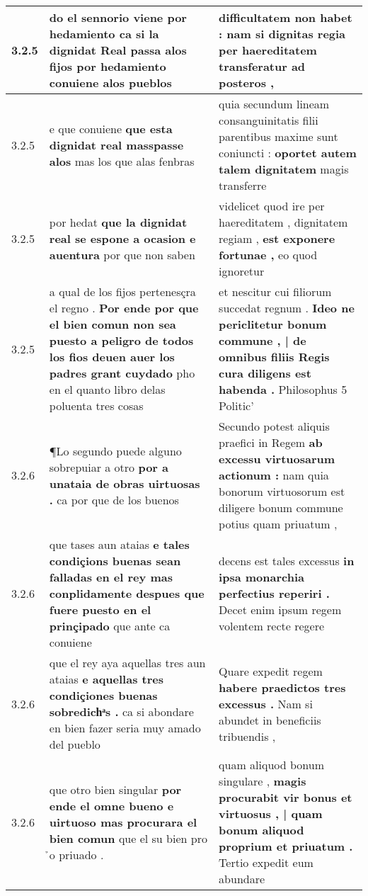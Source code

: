 \begin{tabular}{|p{1cm}|p{6.5cm}|p{6.5cm}|}
3.2.5 & do el sennorio viene por hedamiento \textbf{ ca si la dignidat Real passa alos fijos } por hedamiento conuiene alos pueblos & difficultatem non habet : \textbf{ nam si dignitas regia } per haereditatem transferatur ad posteros , \\\hline
3.2.5 & e que conuiene \textbf{ que esta dignidat real masspasse alos } mas los que alas fenbras & quia secundum lineam consanguinitatis filii parentibus maxime sunt coniuncti : \textbf{ oportet autem talem dignitatem } magis transferre \\\hline
3.2.5 & por hedat \textbf{ que la dignidat real se espone a ocasion e auentura } por que non saben & videlicet quod ire per haereditatem , dignitatem regiam , \textbf{ est exponere fortunae , } eo quod ignoretur \\\hline
3.2.5 & a qual de los fijos pertenesçra el regno . \textbf{ Por ende por que el bien comun non sea puesto a peligro de todos los fios deuen auer los padres grant cuydado } pho en el quanto libro delas poluenta tres cosas & et nescitur cui filiorum succedat regnum . \textbf{ Ideo ne periclitetur bonum commune , | de omnibus filiis Regis cura diligens est habenda . } Philosophus 5 Politic’ \\\hline
3.2.6 & ¶Lo segundo puede alguno sobrepuiar a otro \textbf{ por a unataia de obras uirtuosas . } ca por que de los buenos & Secundo potest aliquis praefici in Regem \textbf{ ab excessu virtuosarum actionum : } nam quia bonorum virtuosorum est diligere bonum commune potius quam priuatum , \\\hline
3.2.6 & que tases aun ataias \textbf{ e tales condiçions buenas sean falladas en el rey mas conplidamente despues que fuere puesto en el prinçipado } que ante ca conuiene & decens est tales excessus \textbf{ in ipsa monarchia perfectius reperiri . } Decet enim ipsum regem volentem recte regere \\\hline
3.2.6 & que el rey aya aquellas tres aun ataias \textbf{ e aquellas tres condiçiones buenas sobredichͣs . } ca si abondare en bien fazer seria muy amado del pueblo & Quare expedit regem \textbf{ habere praedictos tres excessus . } Nam si abundet in beneficiis tribuendis , \\\hline
3.2.6 & que otro bien singular \textbf{ por ende el omne bueno e uirtuoso mas procurara el bien comun } que el su bien pro ̉o priuado . & quam aliquod bonum singulare , \textbf{ magis procurabit vir bonus et virtuosus , | quam bonum aliquod proprium et priuatum . } Tertio expedit eum abundare \\\hline

\end{tabular}

